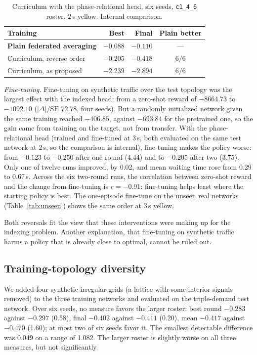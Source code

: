 \documentclass[conference]{IEEEtran}
\begin{document}
\begin{table}[ht]
\caption{Curriculum with the phase-relational head, six seeds, \texttt{c1\_4\_6} roster,
$2$\,s yellow. Internal comparison.}
\label{tab:curriculum}
\centering\footnotesize
\begin{tabular}{@{}lrrc@{}}
\toprule
Training & Best & Final & Plain better \\
\midrule
\textbf{Plain federated averaging} & $\mathbf{-0.088}$ & $\mathbf{-0.110}$ & --- \\
Curriculum, reverse order & $-0.205$ & $-0.418$ & $6/6$ \\
Curriculum, as proposed & $-2.239$ & $-2.894$ & $6/6$ \\
\bottomrule
\end{tabular}
\end{table}

\emph{Fine-tuning.} Fine-tuning on synthetic traffic over the test topology was the largest
effect with the indexed head: from a zero-shot reward of $-8664.73$ to $-1092.10$
($|\Delta|/\mathrm{SE}$ 72.78, four seeds). But a randomly initialized network given the same
training reached $-406.85$, against $-693.84$ for the pretrained one, so the gain came from
training on the target, not from transfer. With the phase-relational head (trained and
fine-tuned at 3\,s, both evaluated on the same test network at 2\,s, so the comparison is
internal), fine-tuning makes the policy worse: from $-0.123$ to $-0.250$ after one round
(4.44) and to $-0.205$ after two (3.75). Only one of twelve runs improved, by 0.02, and mean
waiting time rose from 0.29 to 0.67\,s. Across the six two-round runs, the correlation
between zero-shot reward and the change from fine-tuning is $r=-0.91$: fine-tuning helps
least where the starting policy is best. The one-episode fine-tune on the unseen real
networks (Table~\ref{tab:unseen}) shows the same order at 3\,s yellow.

Both reversals fit the view that these interventions were making up for the indexing
problem. Another explanation, that fine-tuning on synthetic traffic harms a policy that is
already close to optimal, cannot be ruled out.

\subsection{Training-topology diversity}\label{sec:diversity}
We added four synthetic irregular grids (a lattice with some interior signals removed) to
the three training networks and evaluated on the triple-demand test network. Over six
seeds, no measure favors the larger roster: best round $-0.283$ against $-0.297$ (0.58),
final $-0.402$ against $-0.411$ (0.20), mean $-0.417$ against $-0.470$ (1.60); at most two
of six seeds favor it. The smallest detectable difference was 0.049 on a range of 1.082.
The larger roster is slightly worse on all three measures, but not significantly.
\end{document}
